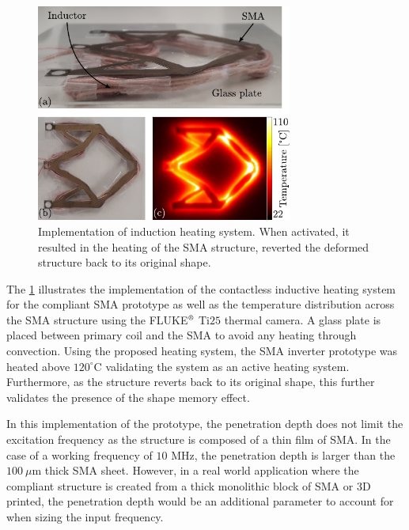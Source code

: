 \begin{figure}[t]
    \centering
    \includegraphics[width=0.75\textwidth]{images/chap5/11_final_results_experiments_heating.pdf}
    \caption{Implementation of induction heating system. When activated, it resulted in the heating of the SMA structure, reverted the deformed structure back to its original shape.}
    \label{fig:induction-heating-temp}
\end{figure}

The \cref{fig:induction-heating-temp} illustrates the implementation of the contactless inductive heating system for the compliant SMA prototype as well as the temperature distribution across the SMA structure using the FLUKE$\textsuperscript \textregistered$ Ti$25$ thermal camera. A glass plate is placed between primary coil and the SMA to avoid any heating through convection. Using the proposed heating system, the SMA inverter prototype was heated above $120^{\circ}$C validating the system as an active heating system. Furthermore, as the structure reverts back to its original shape, this further validates the presence of the shape memory effect.

In this implementation of the prototype, the penetration depth does not limit the excitation frequency as the structure is composed of a thin film of SMA. In the case of a working frequency of $10$ MHz, the penetration depth is larger than the $100~\mu$m thick SMA sheet. However, in a real world application where the compliant structure is created from a thick monolithic block of SMA or 3D printed, the penetration depth would be an additional parameter to account for when sizing the input frequency.

